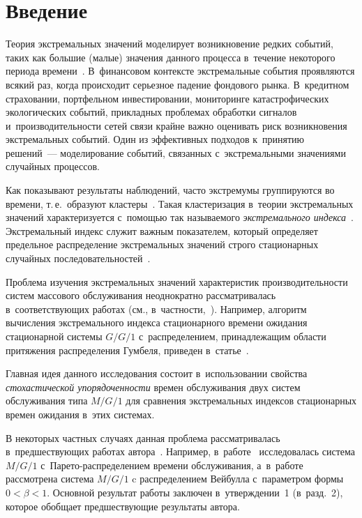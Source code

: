 \begin{multicols}{2}

\label{st\stat}


\section{Введение}

Теория экстремальных значений  моделирует возникновение редких событий, таких 
как большие (малые) значения данного процесса в~течение некоторого периода 
времени~\cite{embrehts, haan, Leadbetter}. В~финансовом контексте экстремальные 
события проявляются  всякий раз, когда происходит серьезное падение фондового 
рынка. В~кредитном страховании, портфельном инвестировании,  мониторинге 
катастрофических экологических событий, прикладных проблемах обработки 
сигналов и~производительности сетей связи крайне важно оценивать  риск возникновения 
экстремальных событий. Один из эффективных подходов к~принятию решений~--- 
моделирование  событий, связанных с~экстремальными значениями случайных 
процессов.

Как показывают результаты наблюдений, часто экстремумы группируются во времени, 
т.\,е.\ образуют кластеры~\cite{Bertail}.  Такая кластеризация в~тео\-рии 
экстремальных значений характеризуется с~по\-мощью так называемого 
\textit{экстремального индекса}~\cite{Resnick}. Экстремальный индекс служит важным 
показателем, который определяет предельное распределение экстремальных значений 
строго стационарных случайных последовательностей~\cite{Leadbetter}.

Проблема изучения экстремальных значений характеристик производительности сис\-тем 
массового обслуживания неоднократно рассматривалась в~соответствующих работах 
(см., в~част\-ности,~\cite{Asmus, asmus2, iglehart, Rootzen}). Например, алгоритм 
вычисления экстремального индекса стационарного времени ожидания стационарной  
системы $G/G/1$ с~распределением, принадлежащим области притяжения распределения 
Гумбеля, приведен в~статье~\cite{Hooghiemstra}.

Главная идея данного  исследования состоит в~использовании свойства \textit{стохастической 
упорядоченности} времен обслуживания двух систем обслуживания 
типа $M/G/1$ для сравнения экстремальных индексов стационарных времен ожидания 
в~этих сис\-те\-мах.

В  некоторых частных случаях данная  проблема рассматривалась в~пред\-шест\-ву\-ющих 
работах автора~\cite{dccn2021, tomsk2021}. Например, в~работе~\cite{dccn2021} 
исследовалась сис\-те\-ма $M/G/1$ с~Парето-распределением времени обслуживания, а~в~работе~\cite{tomsk2021} 
рас\-смот\-ре\-на сис\-те\-ма $M/G/1$ c распределением  Вейбулла  
с~па\-ра\-мет\-ром формы $0< \beta <1$.
Основной результат  работы \cite{tomsk2021} заключен в~утверж\-де\-нии~1 
(в~разд.~2), которое обобщает предшествующие результаты автора.


\end{multicols}
